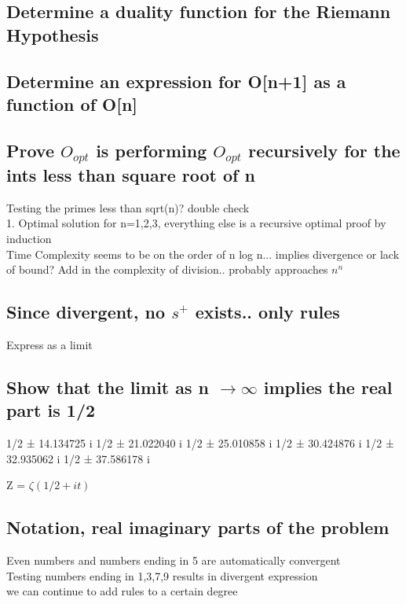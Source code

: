 \documentclass[11pt]{article}
\begin{document}
\subsection{Determine a duality function for the Riemann Hypothesis}
\subsection{Determine an expression for O[n+1] as a function of O[n]}

\subsection{Prove $O_{opt}$ is performing $O_{opt}$ recursively for the ints less than square root of n}
Testing the primes less than sqrt(n)? double check \\
1. Optimal solution for n=1,2,3, everything else is a recursive optimal proof by induction\\
Time Complexity seems to be on the order of n log n... implies divergence or lack of bound? Add in the complexity of division.. probably approaches $n^n$


\subsection{Since divergent, no $s^{+}$ exists.. only rules}
Express as a limit

\subsection{Show that the limit as n $\rightarrow \infty$ implies the real part is 1/2}
1/2 ± 14.134725 i
1/2 ± 21.022040 i
1/2 ± 25.010858 i
1/2 ± 30.424876 i
1/2 ± 32.935062 i
1/2 ± 37.586178 i

Z = $\zeta(1/2 + it)$

\subsection{Notation, real imaginary parts of the problem}
Even numbers and numbers ending in 5 are automatically convergent\\
Testing numbers ending in 1,3,7,9 results in divergent expression\\
we can continue to add rules to a certain degree
\end{document}
